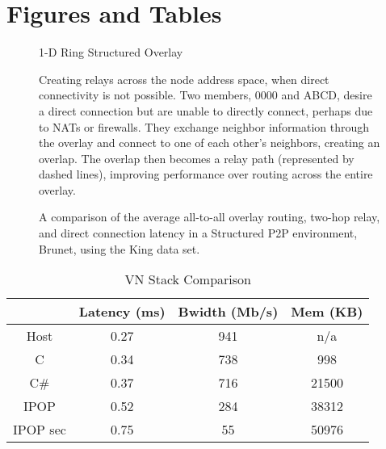 \section{Figures and Tables}

\begin{figure}[ht]
\centering
{}
\caption{1-D Ring Structured Overlay}
\label{fig:ring_overlay}
\end{figure}

\begin{figure}[ht]
\centering
{}
\caption[Proactive relay creation]{Creating relays across the node address
space, when direct connectivity is not possible.  Two members, 0000 and ABCD, 
desire a direct connection but are unable to directly connect, perhaps due to
NATs or firewalls.  They exchange neighbor information through the overlay and
connect to one of each other's neighbors, creating an overlap.  The overlap
then becomes a relay path (represented by dashed lines), improving performance
over routing across the entire overlay.}
\label{fig:relay}
\end{figure}

\begin{figure}[ht]
\centering
{}
\caption[Relay evaluation]{A comparison of the average all-to-all overlay
routing, two-hop relay, and direct connection latency in a Structured P2P
environment, Brunet, using the King data set.}
\label{fig:simulated_relays}
\end{figure}


\begin{table}[ht]
\caption{VN Stack Comparison}
\label{tab:vpn_eval_comp}
\begin{tabular}{c||c|c|c}
& Latency (ms) & Bwidth (Mb/s) & Mem (KB) \\\hline
Host & 0.27 & 941 & n/a \\\hline
C & 0.34 & 738 & 998 \\\hline
C\# & 0.37 & 716 & 21500 \\\hline
IPOP & 0.52 & 284 & 38312 \\\hline
IPOP sec & 0.75 & 55 & 50976 \\\hline
\end{tabular}
\centering
\end{table}
